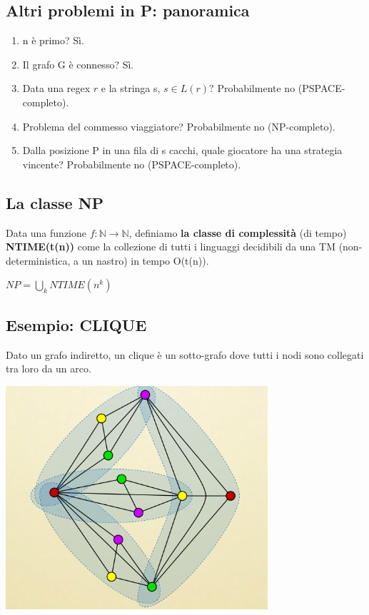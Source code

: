 \documentclass[a4paper, 12pt]{article}
\begin{document}
\subsection{Altri problemi in P: panoramica}
\begin{enumerate}
\item n \`e primo? S\`i.
\item Il grafo G \`e connesso? S\`i.
\item Data una regex $r$ e la stringa s, $s \in L(r)?$ Probabilmente no (PSPACE-completo).
\item Problema del commesso viaggiatore? Probabilmente no (NP-completo).
\item Dalla posizione P in una fila di s cacchi, quale giocatore ha una strategia vincente? Probabilmente no (PSPACE-completo).
\end{enumerate}
\subsection{La classe NP}
Data una funzione $f: \mathbb{N} \rightarrow \mathbb{N}$, definiamo \textbf{la classe di complessit\`a} (di tempo) \textbf{NTIME(t(n))} come la collezione di tutti i linguaggi decidibili da una TM (non-deterministica, a un nastro) in tempo O(t(n)).
\begin{center}
$NP = \bigcup_k NTIME(n^{k})$
\end{center}

\subsection{Esempio: CLIQUE}
Dato un grafo indiretto, un clique \`e un sotto-grafo dove tutti i nodi sono collegati tra loro da un arco.\\
\begin{center}
\includegraphics[scale=0.5]{CLIQUE.png}
\end{center}
\end{document}
